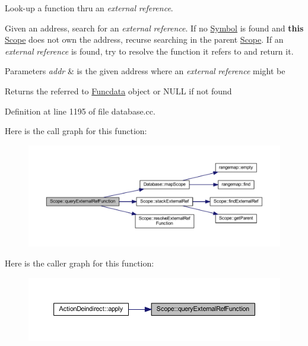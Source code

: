 Look-\/up a function thru an {\itshape external} {\itshape reference}. 

Given an address, search for an {\itshape external} {\itshape reference}. If no \mbox{\hyperlink{class_symbol}{Symbol}} is found and {\bfseries{this}} \mbox{\hyperlink{class_scope}{Scope}} does not own the address, recurse searching in the parent \mbox{\hyperlink{class_scope}{Scope}}. If an {\itshape external} {\itshape reference} is found, try to resolve the function it refers to and return it. 
\begin{DoxyParams}{Parameters}
{\em addr} & is the given address where an {\itshape external} {\itshape reference} might be \\
\hline
\end{DoxyParams}
\begin{DoxyReturn}{Returns}
the referred to \mbox{\hyperlink{class_funcdata}{Funcdata}} object or N\+U\+LL if not found 
\end{DoxyReturn}


Definition at line 1195 of file database.\+cc.

Here is the call graph for this function\+:
\nopagebreak
\begin{figure}[H]
\begin{center}
\leavevmode
\includegraphics[width=350pt]{class_scope_a7850e4fd00c5dcc9299e646d13aae3dc_cgraph}
\end{center}
\end{figure}
Here is the caller graph for this function\+:
\nopagebreak
\begin{figure}[H]
\begin{center}
\leavevmode
\includegraphics[width=350pt]{class_scope_a7850e4fd00c5dcc9299e646d13aae3dc_icgraph}
\end{center}
\end{figure}
\mbox{\label{class_scope_a6f9b49c7da91626fcb1cfacda5236991}} 
